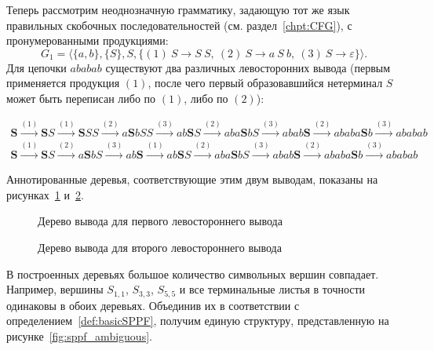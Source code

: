 \begin{example}
    \label{exmpl:basic_sppf_ambiguous}
    Теперь рассмотрим неоднозначную грамматику, задающую тот же язык правильных скобочных последовательностей (см. раздел~\ref{chpt:CFG}), с пронумерованными продукциями:
    \[
    G_1 = \langle \{a,b\}, \{S\}, S, \{(1)\ S \to S \ S, \ (2)\ S \to a \ S \ b, \ (3)\ S \to \varepsilon\} \rangle.
    \]
    Для цепочки $ababab$ существуют два различных левосторонних вывода (первым применяется продукция $(1)$, после чего первый образовавшийся нетерминал $S$ может быть переписан либо по $(1)$, либо по $(2)$):

    \begin{align*}
        \mathbf{S} \xrightarrow{(1)} \mathbf{S}S \xrightarrow{(1)} \mathbf{S}SS \xrightarrow{(2)} a\mathbf{S}bSS \xrightarrow{(3)} ab\mathbf{S}S \xrightarrow{(2)} aba\mathbf{S}bS \xrightarrow{(3)} abab\mathbf{S} \xrightarrow{(2)} ababa\mathbf{S}b \xrightarrow{(3)} ababab
        \\
        \mathbf{S} \xrightarrow{(1)} \mathbf{S}S \xrightarrow{(2)} a\mathbf{S}bS \xrightarrow{(3)} ab\mathbf{S} \xrightarrow{(1)} ab\mathbf{S}S \xrightarrow{(2)} aba\mathbf{S}bS \xrightarrow{(3)} abab\mathbf{S} \xrightarrow{(2)} ababa\mathbf{S}b \xrightarrow{(3)} ababab
    \end{align*}

    Аннотированные деревья, соответствующие этим двум выводам, показаны на рисунках~\ref{fig:sppf_tree1} и~\ref{fig:sppf_tree2}.

    \begin{figure}
        \begin{center}
            \resizebox{0.9\textwidth}{!}{}
        \end{center}
        \caption{Дерево вывода для первого левостороннего вывода}
        \label{fig:sppf_tree1}
    \end{figure}

    \begin{figure}
        \begin{center}
            \resizebox{0.9\textwidth}{!}{}
        \end{center}
        \caption{Дерево вывода для второго левостороннего вывода}
        \label{fig:sppf_tree2}
    \end{figure}

    В построенных деревьях большое количество символьных вершин совпадает.
    Например, вершины $S_{1,1}$, $S_{3,3}$, $S_{5,5}$ и все терминальные листья в точности одинаковы в обоих деревьях.
    Объединив их в соответствии с определением~\ref{def:basicSPPF}, получим единую структуру, представленную на рисунке~\ref{fig:sppf_ambiguous}.


\end{example}
